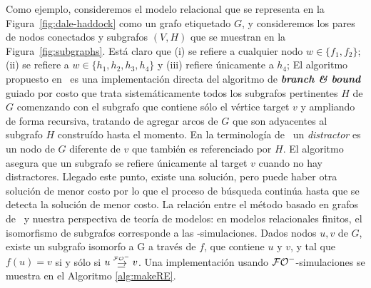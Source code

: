 Como ejemplo, consideremos el modelo relacional que se representa en la
Figura~\ref{fig:dale-haddock} como un grafo etiquetado $G$, y consideremos los pares de nodos conectados y subgrafos $(V, H)$ que se muestran en 
la Figura~\ref{fig:subgraphs}. Est\'a claro que (i) se refiere a cualquier nodo $w\in\{f_1,f_2\}$; (ii) se refiere a $w\in\{h_1,h_2,h_3,h_4\}$
y (iii) refiere \'unicamente a $h_4$; 
El algoritmo propuesto en~\cite{graph} es una
implementaci\'on directa del algoritmo de {\bf \emph{branch \& bound}} guiado por costo que trata sistem\'aticamente todos los
subgrafos pertinentes $H$ de $G$ comenzando con el subgrafo
que contiene s\'olo el v\'ertice target $v$ y ampliando de forma recursiva, tratando de
agregar arcos de $G$ que son adyacentes al subgrafo $H$ constru\'ido
hasta el momento. En la terminolog\'ia de~\cite{graph} un {\em distractor} es un nodo de $G$ diferente de
$v$ que tambi\'en es referenciado por $H$.
El algoritmo asegura que un subgrafo se refiere \'unicamente al target $v$ cuando no hay distractores. Llegado este punto, existe una
soluci\'on, pero puede haber otra
soluci\'on de menor costo por lo que el proceso de b\'usqueda contin\'ua hasta que
se detecta la soluci\'on de menor costo. 
La relaci\'on entre el m\'etodo basado en grafos
de~\cite{graph} y nuestra perspectiva de teor\'ia de modelos: en
modelos relacionales finitos, el isomorfismo de subgrafos corresponde a las
\EPFOL-simulaciones. Dados nodos $u,v$ de
$G$, existe un subgrafo isomorfo a G a trav\'es de $f$, que contiene $ u $ y
$v$, y tal que $f(u)=v$ si y s\'olo si $u \simul{\+\EPFOL} v$. Una implementaci\'on usando $\mathcal{{\mathcal{FO}^-}}$-simulaciones se muestra en el Algoritmo \ref{alg:makeRE}.
%
%

